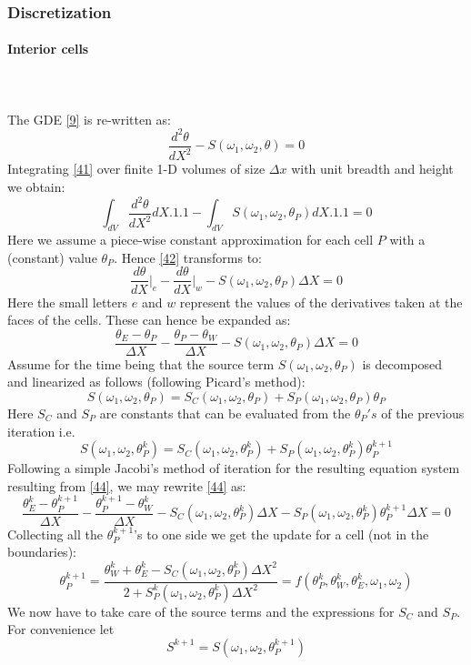 \documentclass[12pt]{article}
\newcommand{\subsubsubsection}[1]{\paragraph{#1}\mbox{}\\}
\begin{document}
\subsubsection{Discretization}
\subsubsubsection{Interior cells}
\\The GDE \eqref{9} is re-written as: 
\[
\frac{d^2 \theta}{dX^2} - S(\omega_1, \omega_2, \theta) = 0 \tag{41} \label{41}
\]
Integrating \eqref{41} over finite 1-D volumes of size $\Delta x$ with unit breadth and height we obtain: \[
\int_{dV} \frac{d^2 \theta}{dX^2} dX.1.1 - \int_{dV} S(\omega_1, \omega_2, \theta_P) dX.1.1 = 0 \tag{42} \label{42}
\]
Here we assume a piece-wise constant approximation for each cell $P$ with a (constant) value $\theta_P$. Hence \eqref{42} transforms to: 
\[
\frac{d \theta}{dX}\Bigr|_e - \frac{d \theta}{dX}\Bigr|_w - S(\omega_1, \omega_2, \theta_P) \Delta X = 0 \tag{43} \label{43} 
\]
Here the small letters $e$ and $w$ represent the values of the derivatives taken at the faces of the cells. These can hence be expanded as: 
\[
\frac{\theta_E - \theta_P}{\Delta X} - \frac{\theta_P - \theta_W}{\Delta X} - S(\omega_1, \omega_2, \theta_P) \Delta X = 0 \tag{44} \label{44} 
\]
Assume for the time being that the source term $S(\omega_1, \omega_2, \theta_P)$ is decomposed and linearized as follows (following Picard's method): 
\[
S(\omega_1, \omega_2, \theta_P) = S_C(\omega_1, \omega_2, \theta_P) + S_P(\omega_1, \omega_2, \theta_P) \theta_P \tag{45} \label{45}
\]
Here $S_C$ and $S_P$ are constants that can be evaluated from the $\theta_P's$ of the previous iteration i.e.
\[
S(\omega_1, \omega_2, \theta_P^{k}) = S_C(\omega_1, \omega_2, \theta_P^{k}) + S_P(\omega_1, \omega_2, \theta_P^{k}) \theta_P^{k+1} \tag{46} \label{46}
\]
Following a simple Jacobi's method of iteration for the resulting equation system resulting from \eqref{44}, we may rewrite \eqref{44} as: 
\[
\frac{\theta_E^k - \theta_P^{k+1}}{\Delta X} - \frac{\theta_P^{k+1} - \theta_W^k}{\Delta X} - S_C(\omega_1, \omega_2, \theta_P^k) \Delta X - S_P(\omega_1, \omega_2, \theta_P^k) \theta_P^{k+1} \Delta X= 0 \tag{47} \label{47} 
\]
Collecting all the $\theta_P^{k+1}$'s to one side we get the update for a cell (not in the boundaries): 
\[
\theta_P^{k+1} = \frac{\theta_W^k+\theta_E^k -S_C(\omega_1, \omega_2,\theta_P^k) \Delta X^2}{2+S_P^k(\omega_1, \omega_2, \theta_P^k) \Delta X^2} = f(\theta_P^k,\theta_W^k, \theta_E^k,\omega_1, \omega_2) \tag{48} \label{48}
\]
We now have to take care of the source terms and the expressions for $S_C$ and $S_P$. For convenience let
\[
S^{k+1} = S(\omega_1, \omega_2, \theta_P^{k+1}) \tag{49} \label{49}
\]
\end{document}
